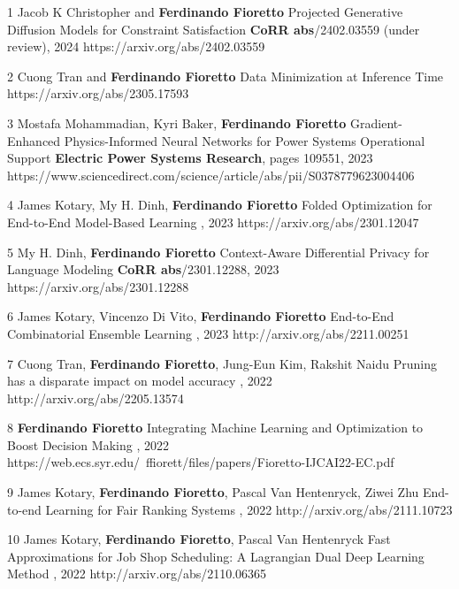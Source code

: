 \documentclass[localFont,alternative]{documentMETADATA}
\begin{document}
\begin{pubs}

\confentryShort
	{1}
	{Jacob K Christopher and {\bf Ferdinando Fioretto}}
  {Projected Generative Diffusion Models for Constraint Satisfaction}
	{\textbf{CoRR abs}/2402.03559 (under review), 2024}
	{https://arxiv.org/abs/2402.03559}

\confentryShort
	{2}
	{{Cuong Tran} and {\bf Ferdinando Fioretto}}
	{Data Minimization at Inference Time}
	{\procNeurIPS}
	{https://arxiv.org/abs/2305.17593}

\confentryShort
	{3}
	{Mostafa Mohammadian, Kyri Baker, \textbf{Ferdinando Fioretto}}
	{Gradient-Enhanced Physics-Informed Neural Networks for Power Systems Operational Support}
	{\textbf{Electric Power Systems Research}, pages 109551, 2023}
	{https://www.sciencedirect.com/science/article/abs/pii/S0378779623004406}

\confentryShort 
	{4} %
	{{James Kotary}, {My H. Dinh}, {\bf Ferdinando Fioretto}}
	{Folded Optimization for End-to-End Model-Based Learning}
	{\procIJCAI, 2023}
	{https://arxiv.org/abs/2301.12047}

	\confentryShort
	{5}%
	{{My H. Dinh}, {\bf Ferdinando Fioretto}}
	{Context-Aware Differential Privacy for Language Modeling}
	{\textbf{CoRR abs}/2301.12288, 2023}
	{https://arxiv.org/abs/2301.12288}

\confentryShort
  {6} %
	{{James Kotary}, {Vincenzo Di Vito}, {\bf Ferdinando Fioretto}}
	{End-to-End Combinatorial Ensemble Learning}
  {\procIJCAI, 2023}
	{http://arxiv.org/abs/2211.00251}

\confentryShort
	{7} %
	{{Cuong Tran}, {\bf Ferdinando Fioretto}, Jung-Eun Kim, {Rakshit Naidu}}
	{Pruning has a disparate impact on model accuracy}
	{\procNeurIPS, 2022}
	{http://arxiv.org/abs/2205.13574}

	\confentryShort
	{8} %
	{{\bf Ferdinando Fioretto}}
	{Integrating Machine Learning and Optimization to Boost Decision Making}
	{\procIJCAI, 2022}
	{https://web.ecs.syr.edu/~ffiorett/files/papers/Fioretto-IJCAI22-EC.pdf}	

	\confentryShort
	{9} %
	{{James Kotary}, {\bf Ferdinando Fioretto}, Pascal Van Hentenryck, Ziwei Zhu}
	{End-to-end Learning for Fair Ranking Systems}
	{\procWWW, 2022}
	{http://arxiv.org/abs/2111.10723}	
	
	\confentryShort
	{10} %
	{{James Kotary}, {\bf Ferdinando Fioretto}, Pascal Van Hentenryck}
	{Fast Approximations for Job Shop Scheduling: A Lagrangian Dual Deep Learning Method}
	{\procAAAI, 2022}
	{http://arxiv.org/abs/2110.06365}


\end{pubs}
\end{document}
